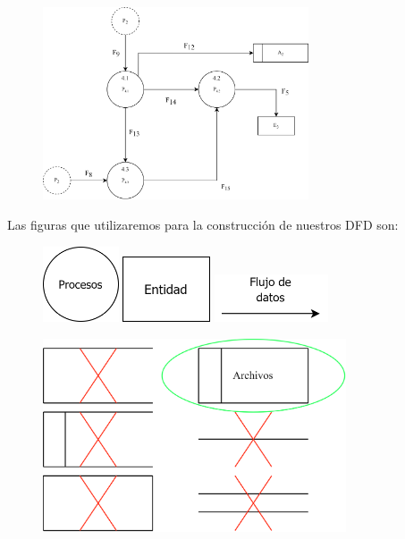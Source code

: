 \documentclass{templateNote}
\begin{document}
\begin{itemize}
    \begin{figure}[H]
        \centering
        \includegraphics[width=0.7\textwidth]{img/Detallado.png}
    \end{figure}
\end{itemize}
Las figuras que utilizaremos para la construcción de nuestros DFD son:
\begin{figure}[H]
    \centering
    \includegraphics[width=0.20\textwidth]{img/procesos.png}\hspace{1.5cm}
    \includegraphics[width=0.23\textwidth]{img/entidad.png}\hspace{1.5cm}
    \includegraphics[width=0.30\textwidth]{img/flujo.png}\hspace{1.5cm}
\end{figure}
\begin{figure}[H]
    \centering
    \includegraphics[width=0.80\textwidth]{img/archivos.png}
\end{figure}
\newpage
\end{document}
